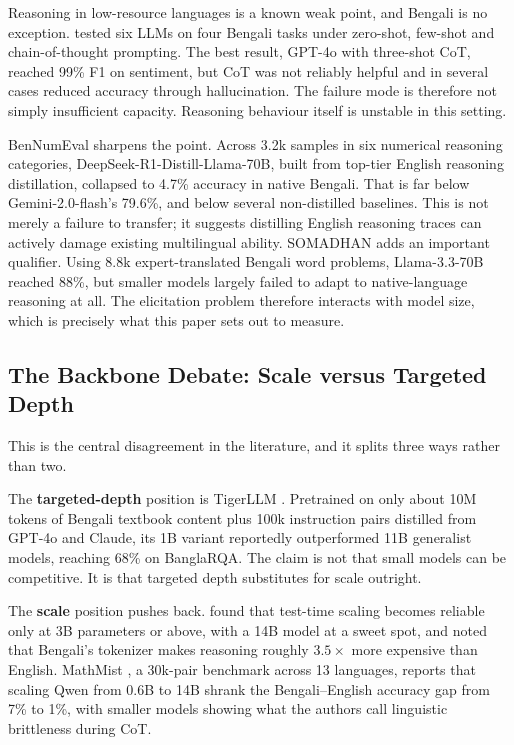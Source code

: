 Reasoning in low-resource languages is a known weak point, and Bengali is no
exception. \textcite{alnazi2025eval} tested six LLMs on four Bengali tasks under
zero-shot, few-shot and chain-of-thought prompting. The best result, GPT-4o with
three-shot CoT, reached 99\% F1 on sentiment, but CoT was not reliably helpful
and in several cases reduced accuracy through hallucination. The failure mode is
therefore not simply insufficient capacity. Reasoning behaviour itself is
unstable in this setting.

BenNumEval \parencite{ahmed2025bennumeval} sharpens the point. Across 3.2k
samples in six numerical reasoning categories,
DeepSeek-R1-Distill-Llama-70B, built from top-tier English reasoning
distillation, collapsed to 4.7\% accuracy in native Bengali. That is far below
Gemini-2.0-flash's 79.6\%, and below several non-distilled baselines. This is
not merely a failure to transfer; it suggests distilling English reasoning
traces can actively damage existing multilingual ability. SOMADHAN
\parencite{paul2025somadhan} adds an important qualifier. Using 8.8k
expert-translated Bengali word problems, Llama-3.3-70B reached 88\%, but smaller
models largely failed to adapt to native-language reasoning at all. The
elicitation problem therefore interacts with model size, which is precisely what
this paper sets out to measure.

\subsection{The Backbone Debate: Scale versus Targeted Depth}

This is the central disagreement in the literature, and it splits three ways
rather than two.

The \textbf{targeted-depth} position is TigerLLM \parencite{raihan2025tigerllm}.
Pretrained on only about 10M tokens of Bengali textbook content plus 100k
instruction pairs distilled from GPT-4o and Claude, its 1B variant reportedly
outperformed 11B generalist models, reaching 68\% on BanglaRQA. The claim is not
that small models can be competitive. It is that targeted depth substitutes for
scale outright.

The \textbf{scale} position pushes back. \textcite{yong2025crosslingual} found
that test-time scaling becomes reliable only at 3B parameters or above, with a
14B model at a sweet spot, and noted that Bengali's tokenizer makes reasoning
roughly $3.5\times$ more expensive than English. MathMist
\parencite{sobhani2026mathmist}, a 30k-pair benchmark across 13 languages,
reports that scaling Qwen from 0.6B to 14B shrank the Bengali--English accuracy
gap from 7\% to 1\%, with smaller models showing what the authors call
linguistic brittleness during CoT.

